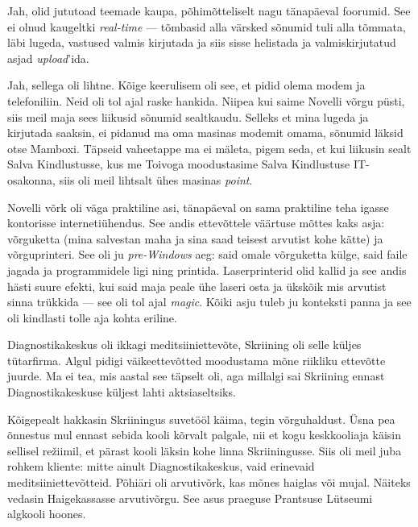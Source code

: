 
Jah, olid jututoad teemade kaupa, põhimõtteliselt nagu tänapäeval foorumid. 
See ei olnud kaugeltki \emph{real-time} --- tõmbasid 
alla värsked sõnumid tuli alla tõmmata, läbi lugeda, vastused valmis kirjutada ja siis sisse helistada ja valmiskirjutatud asjad \emph{upload}'ida. 


Jah, sellega oli lihtne. Kõige keerulisem oli see, et pidid olema modem ja 
telefoniliin. Neid oli tol ajal raske hankida. 
Niipea kui saime Novelli võrgu püsti, siis meil maja sees liikusid 
sõnumid sealtkaudu. Selleks et mina lugeda ja kirjutada saaksin, ei pidanud ma 
oma masinas modemit omama, sõnumid läksid otse Mamboxi. Täpseid vaheetappe ma ei mäleta, pigem seda, et kui liikusin 
sealt Salva Kindlustusse, kus me Toivoga moodustasime Salva Kindlustuse IT-osakonna, 
siis oli meil lihtsalt ühes masinas \emph{point}. 


Novelli võrk oli väga praktiline asi, tänapäeval on sama praktiline 
teha igasse kontorisse internetiühendus. See andis ettevõttele väärtuse 
mõttes kaks asja: võrguketta (mina salvestan maha ja sina saad teisest 
arvutist kohe kätte) ja võrguprinteri. See oli ju \emph{pre-Windows} aeg: 
said omale võrguketta külge, said faile jagada ja programmidele ligi ning 
printida. Laserprinterid olid kallid ja see andis hästi suure efekti, kui
said maja peale ühe laseri osta ja ükskõik mis arvutist sinna trükkida --- see oli 
tol ajal \emph{magic}. Kõiki asju tuleb ju konteksti panna ja see oli kindlasti tolle aja kohta eriline. 


Diagnostikakeskus oli 
ikkagi meditsiiniettevõte, Skriining oli selle küljes 
tütarfirma. Algul pidigi väikeettevõtted moodustama mõne
riikliku ettevõtte juurde. Ma ei tea, mis aastal see täpselt oli, aga 
millalgi sai Skriining ennast Diagnostikakeskuse küljest lahti aktsiaseltsiks. 

Kõigepealt hakkasin Skriiningus suvetööl käima, tegin võrguhaldust. Üsna pea 
õnnestus mul ennast sebida kooli kõrvalt palgale, nii et kogu keskkooliaja 
käisin sellisel režiimil, et pärast kooli läksin kohe linna 
Skriiningusse. Siis oli meil juba rohkem kliente: mitte ainult 
Diagnostikakeskus, vaid erinevaid meditsiiniettevõtteid. Põhiäri oli arvutivõrk, kas mõnes haiglas või mujal. Näiteks vedasin
Haigekassasse arvutivõrgu. See asus praeguse Prantsuse Lütseumi 
algkooli hoones. 

